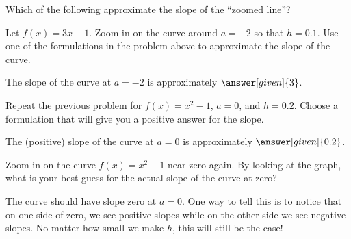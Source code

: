 \documentclass{ximera}
\begin{document}
\begin{problem}
  Which of the following approximate the slope of the ``zoomed line''?
  \begin{multipleResponse}
  \end{multipleResponse}
\end{problem}

\begin{problem}
   Let $f(x) = 3x-1$.  Zoom in on the curve around $a = -2$ so that $h = 0.1$.  Use one of the formulations in the problem above to approximate the slope of the curve.
   
   The slope of the curve at $a = -2$ is approximately $\answer[given]{3}$.
\end{problem}

\begin{problem}
   Repeat the previous problem for $f(x) = x^2 - 1$, $a = 0$, and $h = 0.2$.  Choose a formulation that will give you a positive answer for the slope.
   
   The (positive) slope of the curve at $a = 0$ is approximately $\answer[given]{0.2}$.
\end{problem}


\begin{problem}
   Zoom in on the curve $f(x) = x^2 - 1$ near zero again.  By looking at the graph, what is your best guess for the actual slope of the curve at zero?
   \begin{freeResponse}
   	The curve should have slope zero at $a = 0$.  One way to tell this is to notice that on one side of zero, we see positive slopes while on the other side we see negative slopes.  No matter how small we make $h$, this will still be the case!
   \end{freeResponse}
\end{problem}


\end{document}
